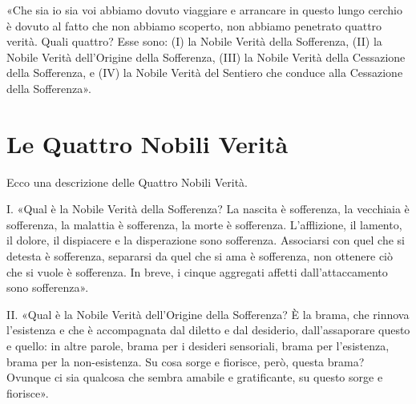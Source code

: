 
«Che sia io sia voi abbiamo dovuto viaggiare e arrancare in questo lungo cerchio
è dovuto al fatto che non abbiamo scoperto, non abbiamo penetrato quattro
verità. Quali quattro? Esse sono: (I) la Nobile Verità della Sofferenza, (II) la
Nobile Verità dell’Origine della Sofferenza, (III) la Nobile Verità della
Cessazione della Sofferenza, e (IV) la Nobile Verità del Sentiero che conduce
alla Cessazione della Sofferenza».


\section*{Le Quattro Nobili Verità}

 Ecco una descrizione delle Quattro Nobili Verità.

 I. «Qual è la Nobile Verità della Sofferenza? La nascita è
sofferenza, la vecchiaia è sofferenza, la malattia è sofferenza, la morte è
sofferenza. L’afflizione, il lamento, il dolore, il dispiacere e la disperazione
sono sofferenza. Associarsi con quel che si detesta è sofferenza, separarsi da
quel che si ama è sofferenza, non ottenere ciò che si vuole è sofferenza. In
breve, i cinque aggregati affetti dall’attaccamento sono sofferenza».


II. «Qual è la Nobile Verità dell’Origine della Sofferenza? È la brama, che
rinnova l’esistenza e che è accompagnata dal diletto e dal desiderio,
dall’assaporare questo e quello: in altre parole, brama per i desideri
sensoriali, brama per l’esistenza, brama per la non-esistenza. Su cosa sorge e
fiorisce, però, questa brama? Ovunque ci sia qualcosa che sembra amabile e
gratificante, su questo sorge e fiorisce».

